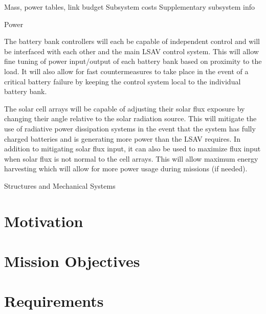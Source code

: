 \documentclass[10pt]{article}
\begin{document}
Mass, power tables, link budget Subsystem costs Supplementary
subsystem info

Power

The battery bank controllers will each be capable of independent
control and will be interfaced with each other and the main LSAV
control system. This will allow fine tuning of power input/output of
each battery bank based on proximity to the load. It will also allow
for fast countermeasures to take place in the event of a critical
battery failure by keeping the control system local to the individual
battery bank.

The solar cell arrays will be capable of adjusting their solar flux
exposure by changing their angle relative to the solar radiation
source. This will mitigate the use of radiative power dissipation
systems in the event that the system has fully charged batteries and
is generating more power than the LSAV requires. In addition to
mitigating solar flux input, it can also be used to maximize flux
input when solar flux is not normal to the cell arrays. This will
allow maximum energy harvesting which will allow for more power usage
during missions (if needed).

Structures and Mechanical Systems



\section{Motivation}
\blindtext

\section{Mission Objectives}
\blindtext

\section{Requirements}
\blindtext
\end{document}
